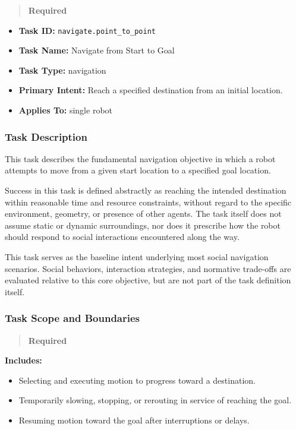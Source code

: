 \documentclass[utf8]{frontiers_suppmat} %
\providecommand{\tightlist}{%
  \setlength{\itemsep}{0pt}\setlength{\parskip}{0pt}}
\begin{document}
\begin{quote}
\textbf{Required}
\end{quote}

\begin{itemize}
\tightlist
\item
  \textbf{Task ID:} \texttt{navigate.point\_to\_point}
\item
  \textbf{Task Name:} Navigate from Start to Goal
\item
  \textbf{Task Type:} navigation
\item
  \textbf{Primary Intent:} Reach a specified destination from an initial
  location.
\item
  \textbf{Applies To:} single robot
\end{itemize}

\subsubsection{Task Description}\label{task-description}

This task describes the fundamental navigation objective in which a
robot attempts to move from a given start location to a specified goal
location.

Success in this task is defined abstractly as reaching the intended
destination within reasonable time and resource constraints, without
regard to the specific environment, geometry, or presence of other
agents. The task itself does not assume static or dynamic surroundings,
nor does it prescribe how the robot should respond to social
interactions encountered along the way.

This task serves as the baseline intent underlying most social
navigation scenarios. Social behaviors, interaction strategies, and
normative trade-offs are evaluated relative to this core objective, but
are not part of the task definition itself.

\subsubsection{Task Scope and
Boundaries}\label{task-scope-and-boundaries}

\begin{quote}
\textbf{Required}
\end{quote}

\textbf{Includes:}

\begin{itemize}
\tightlist
\item
  Selecting and executing motion to progress toward a destination.
\item
  Temporarily slowing, stopping, or rerouting in service of reaching the
  goal.
\item
  Resuming motion toward the goal after interruptions or delays.
\end{itemize}
\end{document}
